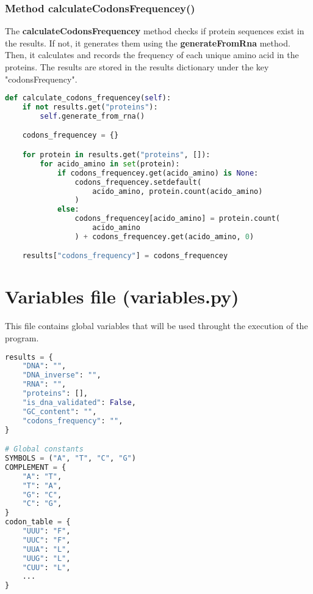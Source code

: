 \documentclass[11pt]{article}
\begin{document}
\subsubsection{Method calculateCodonsFrequencey()}
The \textbf{calculateCodonsFrequencey} method checks if protein sequences exist in the results. If not, it generates them using the \textbf{generateFromRna} method. Then, it calculates and records the frequency of each unique amino acid in the proteins. The results are stored in the results dictionary under the key "codonsFrequency".

\begin{lstlisting}[language=Python, style=PythonStyle]
def calculate_codons_frequencey(self):
    if not results.get("proteins"):
        self.generate_from_rna()

    codons_frequencey = {}

    for protein in results.get("proteins", []):
        for acido_amino in set(protein):
            if codons_frequencey.get(acido_amino) is None:
                codons_frequencey.setdefault(
                    acido_amino, protein.count(acido_amino)
                )
            else:
                codons_frequencey[acido_amino] = protein.count(
                    acido_amino
                ) + codons_frequencey.get(acido_amino, 0)

    results["codons_frequency"] = codons_frequencey
\end{lstlisting}

\section{Variables file (variables.py)}
This file contains global variables that will be used throught the execution of the program.

\begin{lstlisting}[language=Python, style=PythonStyle]
results = {
    "DNA": "",
    "DNA_inverse": "",
    "RNA": "",
    "proteins": [],
    "is_dna_validated": False,
    "GC_content": "",
    "codons_frequency": "",
}

# Global constants
SYMBOLS = ("A", "T", "C", "G")
COMPLEMENT = {
    "A": "T",
    "T": "A",
    "G": "C",
    "C": "G",
}
codon_table = {
    "UUU": "F",
    "UUC": "F",
    "UUA": "L",
    "UUG": "L",
    "CUU": "L",
    ...
}
\end{lstlisting}
\end{document}
